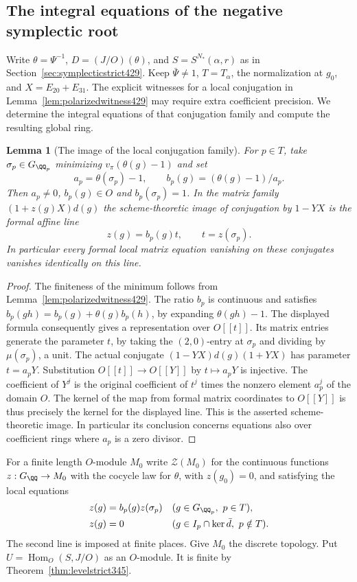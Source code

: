 \documentclass[a4paper,11pt]{article}
\newtheorem{lemma}[proposition]{Lemma}
\theoremstyle{definition}
\theoremstyle{remark}
\numberwithin{equation}{section}
\begin{document}
\subsection{The integral equations of the negative symplectic root}
\label{sec:saturatedstrictroot434}

Write \(\theta=\Psi^{-1}\), \(D=(J/O)(\theta)\), and
\(S=S^{N_*}(\alpha,r)\) as in Section~\ref{sec:symplecticstrict429}.
Keep \(\bar\Psi\ne1\), \(T=T_\alpha\), the normalization at
\(g_0\), and \(X=E_{20}+E_{31}\).
The explicit witnesses for a local conjugation in
Lemma~\ref{lem:polarizedwitness429} may require extra
coefficient precision. We determine the integral equations
of that conjugation family and compute the resulting global
ring.

\begin{lemma}[The image of the local conjugation family]\leavevmode
\label{lem:saturatedorbit434}
For \(p\in T\), take \(\sigma_p\in G_{\QQ_p}\) minimizing
\(v_\pi(\theta(g)-1)\) and set
\[
     a_p=\theta(\sigma_p)-1,\qquad
     b_p(g)=(\theta(g)-1)/a_p .
\]
Then \(a_p\ne0\), \(b_p(g)\in O\) and \(b_p(\sigma_p)=1\).
In the matrix family \((1+z(g)X)d(g)\) the scheme-theoretic
image of conjugation by \(1-YX\) is the formal affine line
\[
                  z(g)=b_p(g)t,\qquad t=z(\sigma_p).
\]
In particular every formal local matrix equation vanishing
on these conjugates vanishes identically on this line.
\end{lemma}
\begin{proof}
The finiteness of the minimum follows from
Lemma~\ref{lem:polarizedwitness429}. The ratio \(b_p\) is
continuous and satisfies
\(b_p(gh)=b_p(g)+\theta(g)b_p(h)\), by expanding
\(\theta(gh)-1\). The displayed formula consequently gives
a representation over \(O[[t]]\). Its matrix entries generate
the parameter \(t\), by taking the \((2,0)\)-entry at
\(\sigma_p\) and dividing by \(\mu(\sigma_p)\), a unit.
The actual conjugate \((1-YX)d(g)(1+YX)\) has parameter
\(t=a_pY\). Substitution \(O[[t]]\to O[[Y]]\) by
\(t\mapsto a_pY\) is injective. The coefficient of \(Y^j\)
is the original coefficient of \(t^j\) times the nonzero
element \(a_p^j\) of the domain \(O\). The kernel of the map
from formal matrix coordinates to \(O[[Y]]\) is thus precisely
the kernel for the displayed line. This is the asserted
scheme-theoretic image. In particular its conclusion concerns
equations also over coefficient rings where \(a_p\) is a
zero divisor.
\end{proof}

For a finite length \(O\)-module \(M_0\) write
\(\mathcal Z(M_0)\) for the continuous functions
\(z:G_\QQ\to M_0\) with the cocycle law for \(\theta\),
with \(z(g_0)=0\), and satisfying the local equations
\[
\begin{aligned}
 z(g)&=b_p(g)z(\sigma_p) &&(g\in G_{\QQ_p},\ p\in T),\\
 z(g)&=0 &&(g\in I_p\cap\ker\bar d,\ p\notin T).
\end{aligned}
\]
The second line is imposed at finite places. Give \(M_0\)
the discrete topology. Put \(U=\operatorname{Hom}_O(S,J/O)\)
as an \(O\)-module. It is finite by
Theorem~\ref{thm:levelstrict345}.
\end{document}
